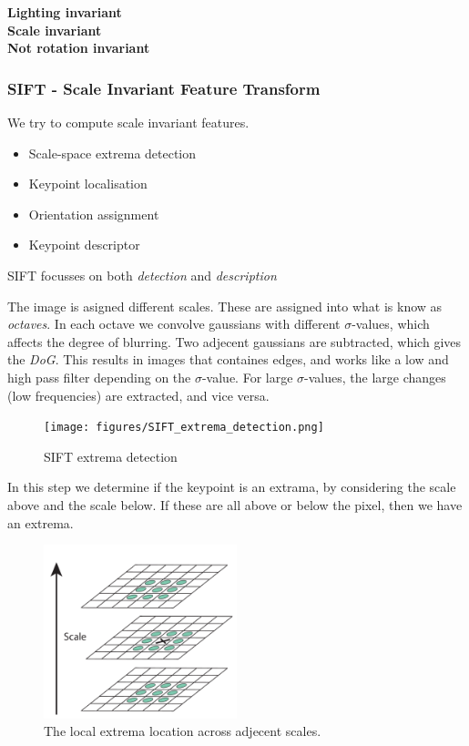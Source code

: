 \documentclass[a4paper]{article}
\begin{document}
\textbf{Lighting invariant} \\
\textbf{Scale invariant} \\
\textbf{Not rotation invariant} 

\subsubsection{SIFT - Scale Invariant Feature Transform}
We try to compute scale invariant features.

\begin{itemize}
	\item Scale-space extrema detection
	\item Keypoint localisation
	\item Orientation assignment
	\item Keypoint descriptor
\end{itemize}

SIFT focusses on both \textit{detection} and \textit{description}  


The image is asigned different scales. These are assigned into what is know as \textit{octaves}. In each octave we convolve gaussians with different $ \sigma $-values, which affects the degree of blurring. Two adjecent gaussians are subtracted, which gives the  \textit{DoG}. This results in images that containes edges, and works like a low and high pass filter depending on the $ \sigma $-value. For large $ \sigma $-values, the large changes (low frequencies) are extracted, and vice versa. 
\begin{figure}[H]
\centering
\texttt{[image: figures/SIFT\_extrema\_detection.png]}
\caption{SIFT extrema detection}
\label{fig:sift_extrema_detection}
\end{figure} 

In this step we determine if the keypoint is an extrama, by considering the scale above and the scale below. If these are all above or below the pixel, then we have an extrema. 
\begin{figure}[H]
\centering
\includegraphics[width=0.5\textwidth]{figures/Local_extrema_location.png}
\caption{The local extrema location across adjecent scales. }
\label{fig:local_extrema_location}
\end{figure} 
\end{document}
